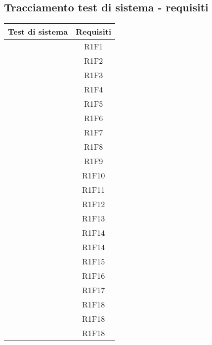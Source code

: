 \subsection{Tracciamento test di sistema - requisiti}
\resetCTS

\begin{center}
	\begin{longtable}{|c|c|}
	\hline
	\rowcolor{lighter-grayer}
	\textbf{Test di sistema} & \textbf{Requisiti} \\
	\hline
	\endfirsthead

	\hline
	 & R1F1 \\
	 & R1F2 \\
	 & R1F3 \\
	 & R1F4 \\
	 & R1F5 \\
	 & R1F6 \\
	 & R1F7 \\
	 & R1F8 \\
	 & R1F9 \\
	 & R1F10 \\

	 & R1F11  \\
	 & R1F12 \\
	 & R1F13 \\
	 & R1F14 \\
	 & R1F14 \\
	 & R1F15 \\
	 & R1F16 \\
	 & R1F17 \\
	 & R1F18 \\
	 & R1F18 \\
	 & R1F18 \\


\end{longtable}
\end{center}
